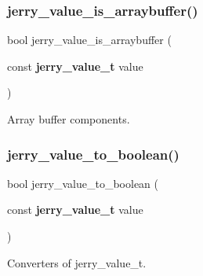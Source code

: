 \subsubsection{jerry\_value\_is\_arraybuffer()}
{\footnotesize\ttfamily bool jerry\+\_\+value\+\_\+is\+\_\+arraybuffer (\begin{DoxyParamCaption}\item[{const \textbf{ jerry\+\_\+value\+\_\+t}}]{value }\end{DoxyParamCaption})}

Array buffer components. \mbox{\label{group___core_gab9c05b5f17c3f63adfa4396b113aef6a}} 
\subsubsection{jerry\_value\_to\_boolean()}
{\footnotesize\ttfamily bool jerry\+\_\+value\+\_\+to\+\_\+boolean (\begin{DoxyParamCaption}\item[{const \textbf{ jerry\+\_\+value\+\_\+t}}]{value }\end{DoxyParamCaption})}

Converters of \textquotesingle{}jerry\+\_\+value\+\_\+t\textquotesingle{}. 